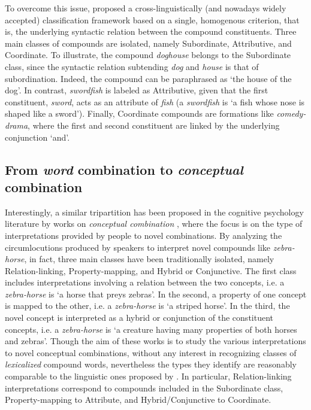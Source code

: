 \documentclass[output=paper]{langsci/langscibook}
\begin{document}
To overcome this issue, \cite{SB2005} proposed a cross-linguistically (and nowadays widely accepted) classification framework based on a single, homogenous criterion, that is, the underlying syntactic relation between the compound constituents. Three main classes of compounds are isolated, namely Subordinate, Attributive, and Coordinate. To illustrate, the compound \emph{doghouse} belongs to the Subordinate class, since the syntactic relation subtending \emph{dog} and \emph{house} is that of subordination. Indeed, the compound can be paraphrased as `the house of the dog'. In contrast, \emph{swordfish} is labeled as Attributive, given that the first constituent, \emph{sword}, acts as an attribute of \emph{fish} (a \emph{swordfish} is `a fish whose nose is shaped like a sword'). Finally, Coordinate compounds are formations like \emph{comedy-drama}, where the first and second constituent are linked by the underlying conjunction `and'.

\subsection{From \emph{word} combination to \emph{conceptual} combination}

Interestingly, a similar tripartition has been proposed in the cognitive psychology literature by works on \emph{conceptual combination} \citep{wisniewski1996,costello2000}, where the focus is on the type of interpretations provided by people to novel combinations. By analyzing the circumlocutions produced by speakers to interpret novel compounds like \emph{zebra-horse}, in fact, three main classes have been traditionally isolated, namely Relation-linking, Property-mapping, and Hybrid or Conjunctive. The first class includes interpretations involving a relation between the two concepts, i.e. a \emph{zebra-horse} is `a horse that preys zebras'. In the second, a property of one concept is mapped to the other, i.e. a \emph{zebra-horse} is `a striped horse'. In the third, the novel concept is interpreted as a hybrid or conjunction of the constituent concepts, i.e. a \emph{zebra-horse} is `a creature having many properties of both horses and zebras'. Though the aim of these works is to study the various interpretations to novel conceptual combinations, without any interest in recognizing classes of \emph{lexicalized} compound words, nevertheless the types they identify are reasonably comparable to the linguistic ones proposed by \cite{SB2005}. In particular, Relation-linking interpretations correspond to compounds included in the Subordinate class, Property-mapping to Attribute, and Hybrid/Conjunctive to Coordinate.
\end{document}
